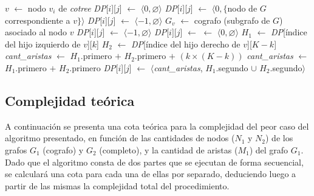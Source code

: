 \begin{algorithm}[H]
     {
        $v$ $\gets$ nodo $v_i$ de \textit{cotree} \;
         {
             {
                \textit{DP}[$i$][$j$] $\gets$ $\langle 0, \varnothing \rangle$ \;
            } {
                 {
                     {
                        \textit{DP}[$i$][$j$] $\gets$ $\langle 0,
                        \lbrace$nodo de $G$ correspondiente a $v \rbrace \rangle$ \;
                    } {
                        \textit{DP}[$i$][$j$] $\gets$ $\langle -1, \varnothing \rangle$ \;
                    }
                } {
                    $G_v$ $\gets$ cografo (subgrafo de $G$) asociado al nodo $v$ \;
                     {
                        \textit{DP}[$i$][$j$] $\gets$ $\langle -1, \varnothing \rangle$ \;
                    } {
                        \textit{DP}[$i$][$j$] $\gets$ $\gets$ $\langle 0, \varnothing \rangle$ \;
                         {
                            $H_1$ $\gets$ \textit{DP}[índice del hijo izquierdo de $v$][$k$] \;
                            $H_2$ $\gets$ \textit{DP}[índice del hijo derecho de $v$][$K-k$] \;
                             {
                                 {
                                    \textit{cant\_aristas} $\gets$ $H_1$.primero $+$
                                        $H_2$.primero $+$ $(k \times (K - k))$ \;
                                } {
                                    \textit{cant\_aristas} $\gets$ $H_1$.primero $+$
                                        $H_2$.primero \;
                                }
                            }
                             {
                                \textit{DP}[$i$][$j$] $\gets$ $\langle$\textit{cant\_aristas},
                                    $H_1$.segundo $\cup$ $H_2$.segundo$\rangle$ \;
                            }
                        }
                    }
                }
            }
        }
    }
\end{algorithm}
\bigskip

\subsection{Complejidad teórica}
A continuación se presenta una cota teórica para la complejidad del peor caso
del algoritmo presentado, en función de las cantidades de nodos ($N_1$ y
$N_2$) de los grafos $G_1$ (cografo) y $G_2$ (completo), y la cantidad de
aristas ($M_1$) del grafo $G_1$. Dado que el algoritmo consta de dos partes
que se ejecutan de forma secuencial, se calculará una cota para cada una de
ellas por separado, deduciendo luego a partir de las mismas la complejidad
total del procedimiento.

